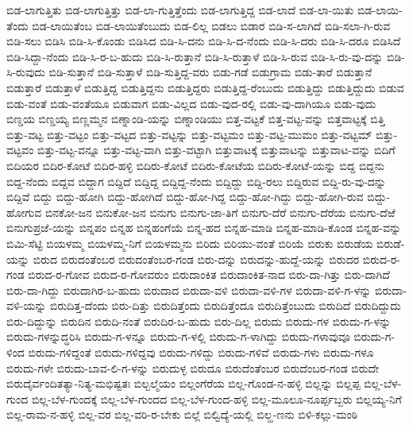 ಬಿಡ-ಲಾಗುತ್ತಿತು
ಬಿಡ-ಲಾಗುತ್ತಿತ್ತು
ಬಿಡ-ಲಾ-ಗುತ್ತಿತ್ತೆಂದು
ಬಿಡ-ಲಾಗುತ್ತಿದ್ದ
ಬಿಡ-ಲಾದೆ
ಬಿಡ-ಲಾ-ಯಿತು
ಬಿಡ-ಲಾಯಿ-ತೆಂದು
ಬಿಡ-ಲಾಯಿತೆಂಬ
ಬಿಡ-ಲಾಯಿತೆಂಬುದು
ಬಿಡ-ಲಿಲ್ಲ
ಬಿಡಲು
ಬಿಡಾರ
ಬಿಡಿ-ಸ-ಲಾಗಿದೆ
ಬಿಡಿ-ಸಲಾ-ಗಿ-ರುವ
ಬಿಡಿ-ಸಲು
ಬಿಡಿಸಿ
ಬಿಡಿ-ಸಿ-ಕೊಂಡು
ಬಿಡಿಸಿದ
ಬಿಡಿ-ಸಿ-ದನು
ಬಿಡಿ-ಸಿ-ದ-ನೆಂದು
ಬಿಡಿ-ಸಿ-ದರು
ಬಿಡಿ-ಸಿ-ದರೂ
ಬಿಡಿಸಿದೆ
ಬಿಡಿ-ಸಿದ್ದಾ-ನೆಂದು
ಬಿಡಿ-ಸಿ-ರ-ಬ-ಹುದು
ಬಿಡಿ-ಸಿ-ರುತ್ತಾನೆ
ಬಿಡಿ-ಸಿ-ರುತ್ತಾಳೆ
ಬಿಡಿ-ಸಿ-ರುವ
ಬಿಡಿ-ಸಿ-ರು-ವು-ದನ್ನು
ಬಿಡಿ-ಸಿ-ರುವುದು
ಬಿಡಿ-ಸುತ್ತಾನೆ
ಬಿಡಿ-ಸುತ್ತಾಳೆ
ಬಿಡಿ-ಸುತ್ತಿದ್ದ-ವರು
ಬಿಡು-ಗಡೆ
ಬಿಡುಗ್ರಾಮ
ಬಿಡು-ತಾರೆ
ಬಿಡುತ್ತಾನೆ
ಬಿಡುತ್ತಾರೆ
ಬಿಡುತ್ತಾಳೆ
ಬಿಡುತ್ತಿದ್ದ
ಬಿಡುತ್ತಿದ್ದನು
ಬಿಡುತ್ತಿದ್ದರು
ಬಿಡುತ್ತಿದ್ದ-ರೆಂಬುದು
ಬಿಡುತ್ತಿದ್ದು
ಬಿಡುತ್ತಿದ್ದುದು
ಬಿಡುವ
ಬಿಡು-ವಂತೆ
ಬಿಡು-ವಂತೆಯೂ
ಬಿಡುವಾಗ
ಬಿಡು-ವಿಲ್ಲದ
ಬಿಡು-ವುದ-ರಲ್ಲಿ
ಬಿಡು-ವು-ದಾಗಿಯೂ
ಬಿಡು-ವುದು
ಬಿಣ್ಡಯ
ಬಿಣ್ಡಯ್ಯ
ಬಿಣ್ಣಮ್ಮನ
ಬಿಣ್ನಾಂಡಿ-ಯನ್ನು
ಬಿಣ್ನಾಂಡಿಯು
ಬಿತ್ತ-ವಟ್ಟಕೆ
ಬಿತ್ತ-ವಟ್ಟ-ವನ್ನು
ಬಿತ್ತವಾಟ್ಟಕ್ಕೆ
ಬಿತ್ತಿ
ಬಿತ್ತು-ವಟ್ಟ
ಬಿತ್ತು-ವಟ್ಟಂ
ಬಿತ್ತು-ವಟ್ಟದ
ಬಿತ್ತು-ವಟ್ಟನ್ನು
ಬಿತ್ತು-ವಟ್ಟಮಂ
ಬಿತ್ತು-ವಟ್ಟ-ಮುಮಂ
ಬಿತ್ತು-ವಟ್ಟಮ್
ಬಿತ್ತು-ವಟ್ಟವಂ
ಬಿತ್ತು-ವಟ್ಟ-ವನ್ನೂ
ಬಿತ್ತು-ವಟ್ಟ-ವಾಗಿ
ಬಿತ್ತು-ವಟ್ಟಾಗಿ
ಬಿತ್ತುವಾಟಕ್ಕೆ
ಬಿತ್ತುವಾಟನ್ನು
ಬಿತ್ತುವಾಟ-ವನ್ನು
ಬಿದಿಗೆ
ಬಿದಿಯರ
ಬಿದಿರ-ಕೋಟೆ
ಬಿದಿರ-ಹಳ್ಳಿ
ಬಿದಿರು-ಕೋಟೆ
ಬಿದಿರು-ಕೋಟೆಯ
ಬಿದಿರು-ಕೋಟೆ-ಯನ್ನು
ಬಿದ್ದ
ಬಿದ್ದನು
ಬಿದ್ದ-ನೆಂದು
ಬಿದ್ದವ
ಬಿದ್ದಾಗ
ಬಿದ್ದಿದೆ
ಬಿದ್ದಿದ್ದ
ಬಿದ್ದಿದ್ದ-ನೆಂದು
ಬಿದ್ದಿದ್ದು
ಬಿದ್ದಿ-ರಲು
ಬಿದ್ದಿರುವ
ಬಿದ್ದಿ-ರು-ವು-ದನ್ನು
ಬಿದ್ದಿವೆ
ಬಿದ್ದು
ಬಿದ್ದು-ಹೋಗಿ
ಬಿದ್ದು-ಹೋಗಿದೆ
ಬಿದ್ದು-ಹೋ-ಗಿದ್ದ
ಬಿದ್ದು-ಹೋ-ಗಿದ್ದು
ಬಿದ್ದು-ಹೋಗಿ-ರುವ
ಬಿದ್ದು-ಹೋಗುವ
ಬಿನಕೋ-ಜನ
ಬಿನುಕೋ-ಜನ
ಬಿನುಗು
ಬಿನುಗು-ಜಾ-ತಿಗೆ
ಬಿನುಗು-ದೆರೆ
ಬಿನುಗು-ದೆರೆಯ
ಬಿನುಗು-ದೆಱೆ
ಬಿನುಗುಪ್ರಜೆ-ಯನ್ನು
ಬಿನ್ನಪಂ
ಬಿನ್ನಹ
ಬಿನ್ನಹಂಗೆಯೆ
ಬಿನ್ನ-ಹದ
ಬಿನ್ನಹ-ಮಾಡಿ
ಬಿನ್ನಹ-ಮಾಡಿ-ಕೊಂಡ
ಬಿನ್ನಹ-ವನ್ನು
ಬಿಮಿ-ಸೆಟ್ಟಿ
ಬಿಯಳಮ್ಮ
ಬಿಯಳಮ್ಮ-ನಿಗೆ
ಬಿಯಳಮ್ಮನು
ಬಿರಿದು
ಬಿರಿಯು-ವಂತೆ
ಬಿರಿಯೆ
ಬಿರುಕು
ಬಿರುಡೆಯ
ಬಿರುಡೆ-ಯನ್ನು
ಬಿರುದ
ಬಿರುದಂತೆಂಬರ
ಬಿರುದಂತೆಂಬರ-ಗಂಡ
ಬಿರು-ದನ್ನು
ಬಿರುದನ್ನು-ಹುದ್ದೆ-ಯನ್ನು
ಬಿರುದರ
ಬಿರುದ-ರ-ಗಂಡ
ಬಿರುದ-ರ-ಗೋವ
ಬಿರುದ-ರ-ಗೋವರುಂ
ಬಿರುದಾಂಕಿತ
ಬಿರುದಾಂಕಿತ-ನಾದ
ಬಿರು-ದಾ-ಗಿತ್ತು
ಬಿರು-ದಾಗಿದೆ
ಬಿರು-ದಾ-ಗಿದ್ದು
ಬಿರುದಾಗಿರ-ಬ-ಹುದು
ಬಿರುದಾದ
ಬಿರುದಾ-ವಳಿ
ಬಿರುದಾ-ವಳಿ-ಗಳ
ಬಿರುದಾ-ವಳಿ-ಗ-ಳನ್ನು
ಬಿರುದಾ-ವಳಿ-ಯನ್ನು
ಬಿರುದಿತ್ತ-ದೆಂದು
ಬಿರು-ದಿತ್ತು
ಬಿರುದಿತ್ತೆಂದು
ಬಿರುದಿತ್ತೆಂದೂ
ಬಿರುದಿತ್ತೆಂಬುದು
ಬಿರುದಿದೆ
ಬಿರುದಿದ್ದುದು
ಬಿರು-ದಿದ್ದುನ್ನು
ಬಿರುದಿನ
ಬಿರುದಿ-ನಂತೆ
ಬಿರುದಿರ-ಬ-ಹುದು
ಬಿರು-ದಿಲ್ಲ
ಬಿರುದು
ಬಿರುದು-ಗಳ
ಬಿರುದು-ಗ-ಳನ್ನು
ಬಿರುದು-ಗಳನ್ನುದ್ಧರಿಸಿ
ಬಿರುದು-ಗ-ಳನ್ನೂ
ಬಿರುದು-ಗ-ಳಲ್ಲಿ
ಬಿರುದು-ಗ-ಳಾಗಿದ್ದು
ಬಿರುದು-ಗಳಾವುವೂ
ಬಿರುದು-ಗ-ಳಿಂದ
ಬಿರುದು-ಗಳಿದ್ದಂತೆ
ಬಿರುದು-ಗಳಿದ್ದವು
ಬಿರುದು-ಗಳಿದ್ದು
ಬಿರುದು-ಗಳಿವೆ
ಬಿರುದು-ಗಳು
ಬಿರುದು-ಗಳೂ
ಬಿರುದು-ಗಳೇ
ಬಿರುದು-ಬಾವ-ಲಿ-ಗ-ಳನ್ನು
ಬಿರುದುಳ್ಳ
ಬಿರುದೂ
ಬಿರುದೆಂತೆಂಬರ
ಬಿರುದೆಂಬರ-ಗಂಡ
ಬಿರುದೇ
ಬಿರುದೈರ್ವಂದಿತತ್ಯಾ-ನಿತ್ಯ-ಮಭಿಷ್ಟತಃ
ಬಿಲ್ಬಲ್ಮೆಯಂ
ಬಿಲ್ಲಂಗೆರೆಯ
ಬಿಲ್ಲ-ಗೊಂಡ-ನ-ಹಳ್ಳಿ
ಬಿಲ್ಲನ್ನು
ಬಿಲ್ಲಪ್ಪ
ಬಿಲ್ಲ-ಬೆಳ-ಗುಂದ
ಬಿಲ್ಲ-ಬೆಳ-ಗುಂದಕ್ಕೆ
ಬಿಲ್ಲ-ಬೆಳ-ಗುಂದದ
ಬಿಲ್ಲ-ಬೆಳ-ಗುಂದ-ಹಳ್ಳಿ
ಬಿಲ್ಲ-ಮೂಲೂ-ನೂರ್ಪ್ಪಬ್ಬರು
ಬಿಲ್ಲಯ್ಯ-ನಿಗೆ
ಬಿಲ್ಲ-ರಾಮ-ನ-ಹಳ್ಳಿ
ಬಿಲ್ಲ-ವರ
ಬಿಲ್ಲ-ವರಿ-ರ-ಬೇಕು
ಬಿಲ್ಲೆ
ಬಿಲ್ವಿದ್ಯೆ-ಯಲ್ಲಿ
ಬಿಲ್ಹ-ಣನು
ಬಿಳಿ-ಕಲ್ಲು-ಮಂಠಿ
